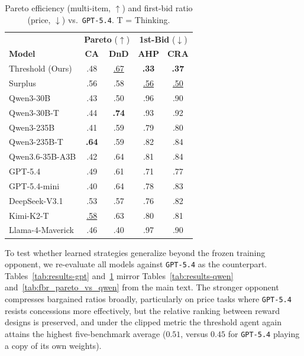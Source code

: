 \documentclass[11pt]{article}
\newcommand{\model}[1]{\texttt{#1}}
\newcommand{\lightrule}{\arrayrulecolor{black!20}\midrule\arrayrulecolor{black}}
\begin{document}
\begin{table}[ht]
\centering
\scriptsize
\setlength{\tabcolsep}{3pt}
\renewcommand{\arraystretch}{1.15}
\begin{tabular}{l cc cc}
\toprule
\rowcolor{tableheader}
& \multicolumn{2}{c}{\textbf{Pareto} ($\uparrow$)} & \multicolumn{2}{c}{\textbf{1st-Bid} ($\downarrow$)} \\
\rowcolor{tableheader}
\textbf{Model} & \textbf{CA} & \textbf{DnD} & \textbf{AHP} & \textbf{CRA} \\
\midrule
\rowcolor{tablerow}
Threshold (Ours) & .48              & \underline{.67}  & \textbf{.33} & \textbf{.37} \\
Surplus   & .56              & .58              & \underline{.56} & \underline{.50} \\
\lightrule
\rowcolor{tablerow}
Qwen3-30B        & .43              & .50              & .96          & .90 \\
Qwen3-30B-T      & .44              & \textbf{.74}     & .93          & .92 \\
\rowcolor{tablerow}
Qwen3-235B       & .41              & .59              & .79          & .80 \\
Qwen3-235B-T     & \textbf{.64}     & .59              & .82          & .84 \\
\rowcolor{tablerow}
Qwen3.6-35B-A3B  & .42              & .64              & .81          & .84 \\
GPT-5.4          & .49              & .61              & .71          & .77 \\
GPT-5.4-mini     & .40              & .64              & .78          & .83 \\
\rowcolor{tablerow}
DeepSeek-V3.1    & .53              & .57              & .76          & .82 \\
Kimi-K2-T        & \underline{.58}  & .63              & .80          & .81 \\
\rowcolor{tablerow}
Llama-4-Maverick & .46              & .40              & .97          & .90 \\
\bottomrule
\end{tabular}
\caption{Pareto efficiency (multi-item, $\uparrow$) and first-bid ratio (price, $\downarrow$) vs.\ \model{GPT-5.4}. T = Thinking.}
\label{tab:fbr_pareto_vs_gpt}
\end{table}



To test whether learned strategies generalize beyond the frozen training opponent, we re-evaluate all models against \model{GPT-5.4} as the counterpart. Tables~\ref{tab:results-gpt} and~\ref{tab:fbr_pareto_vs_gpt} mirror Tables~\ref{tab:results-qwen} and~\ref{tab:fbr_pareto_vs_qwen} from the main text. The stronger opponent compresses bargained ratios broadly, particularly on price tasks where \model{GPT-5.4} resists concessions more effectively, but the relative ranking between reward designs is preserved, and under the clipped metric the threshold agent again attains the highest five-benchmark average ($0.51$, versus $0.45$ for \model{GPT-5.4} playing a copy of its own weights).
\end{document}
